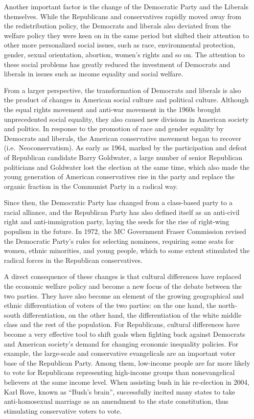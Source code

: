 \documentclass[11pt]{article}
\begin{document}
Another important factor is the change of the Democratic Party and the Liberals themselves. While the Republicans and conservatives rapidly moved away from the redistribution policy, the Democrats and liberals also deviated from the welfare policy they were keen on in the same period but shifted their attention to other more personalized social issues, such as race, environmental protection, gender, sexual orientation, abortion, women's rights and so on. The attention to these social problems has greatly reduced the investment of Democrats and liberals in issues such as income equality and social welfare.

From a larger perspective, the transformation of Democrats and liberals is also the product of changes in American social culture and political culture. Although the equal rights movement and anti-war movement in the 1960s brought unprecedented social equality, they also caused new divisions in American society and politics. In response to the promotion of race and gender equality by Democrats and liberals, the American conservative movement began to recover (i.e.\ Neoconservatism). As early as 1964, marked by the participation and defeat of Republican candidate Barry Goldwater, a large number of senior Republican politicians and Goldwater lost the election at the same time, which also made the young generation of American conservatives rise in the party and replace the organic fraction in the Communist Party in a radical way.

Since then, the Democratic Party has changed from a class-based party to a racial alliance, and the Republican Party has also defined itself as an anti-civil right and anti-immigration party, laying the seeds for the rise of right-wing populism in the future. In 1972, the MC Government Fraser Commission revised the Democratic Party's rules for selecting nominees, requiring some seats for women, ethnic minorities, and young people, which to some extent stimulated the radical forces in the Republican conservatives.

A direct consequence of these changes is that cultural differences have replaced the economic welfare policy and become a new focus of the debate between the two parties. They have also become an element of the growing geographical and ethnic differentiation of voters of the two parties: on the one hand, the north-south differentiation, on the other hand, the differentiation of the white middle class and the rest of the population. For Republicans, cultural differences have become a very effective tool to shift goals when fighting back against Democrats and American society's demand for changing economic inequality policies. For example, the large-scale and conservative evangelicals are an important voter base of the Republican Party. Among them, low-income people are far more likely to vote for Republicans representing high-income groups than nonevangelical believers at the same income level. When assisting bush in his re-election in 2004, Karl Rove, known as “Bush's brain”, successfully incited many states to take anti-homosexual marriage as an amendment to the state constitution, thus stimulating conservative voters to vote.
\end{document}
